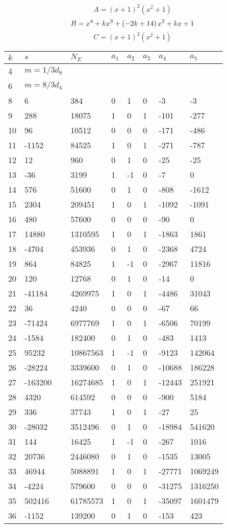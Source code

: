 \documentclass{amsart}
\begin{document}
$$A=(x
 + 1)^{2}(x^2
 + 1)$$
$$B=x^4
 + k\*x^3
 + \left(-2\*k
 + 14\right) \*x^2
 + k\*x
 + 1$$
$$C=(x
 + 1)^{2}(x^2
 + 1)$$
\begin{longtable}{|l|l|l|lllll|}
\hline
$k$ & $s$ & $N_E$ & $a_1$ & $a_2$ & $a_3$ & $a_4$ & $a_5$\\
\hline
4&$m=1/3d_{8}$&&\multicolumn{5}{c|}{}\\
6&$m=8/3d_{4}$&&\multicolumn{5}{c|}{}\\
8&6&384&0&1&0&-3&-3\\
9&288&18075&1&0&1&-101&-277\\
10&96&10512&0&0&0&-171&-486\\
11&-1152&84525&1&0&1&-271&-787\\
12&12&960&0&1&0&-25&-25\\
13&-36&3199&1&-1&0&-7&0\\
14&576&51600&0&1&0&-808&-1612\\
15&2304&209451&1&0&1&-1092&-1091\\
16&480&57600&0&0&0&-90&0\\
17&14880&1310595&1&0&1&-1863&1861\\
18&-4704&453936&0&1&0&-2368&4724\\
19&864&84825&1&-1&0&-2967&11816\\
20&120&12768&0&1&0&-14&0\\
21&-41184&4269975&1&0&1&-4486&31043\\
22&36&4240&0&0&0&-67&66\\
23&-71424&6977769&1&0&1&-6506&70199\\
24&-1584&182400&0&1&0&-483&1413\\
25&95232&10867563&1&-1&0&-9123&142064\\
26&-28224&3339600&0&1&0&-10688&186228\\
27&-163200&16274685&1&0&1&-12443&251921\\
28&4320&614592&0&0&0&-900&5184\\
29&336&37743&1&0&1&-27&25\\
30&-28032&3512496&0&1&0&-18984&541620\\
31&144&16425&1&-1&0&-267&1016\\
32&20736&2446080&0&1&0&-1535&13005\\
33&46944&5088891&1&0&1&-27771&1069249\\
34&-4224&579600&0&0&0&-31275&1316250\\
35&502416&61785573&1&0&1&-35097&1601479\\
36&-1152&139200&0&1&0&-153&423\\

\end{longtable}
\end{document}

